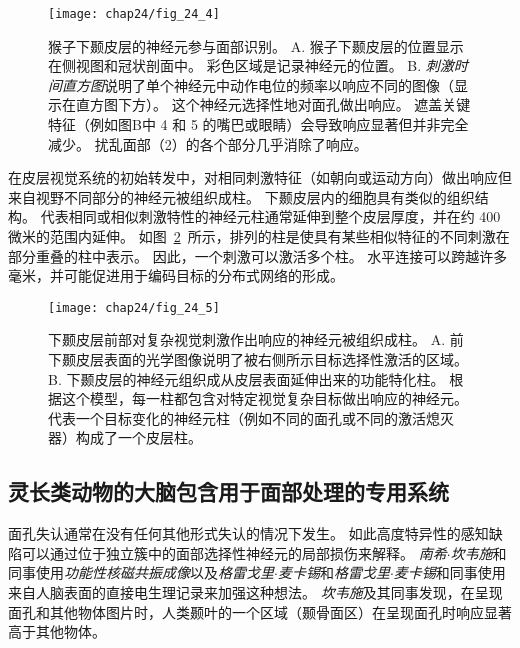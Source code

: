 \begin{figure}[htbp]
	\centering
	\texttt{[image: chap24/fig\_24\_4]}
	\caption{猴子下颞皮层的神经元参与面部识别。
		A. 猴子下颞皮层的位置显示在侧视图和冠状剖面中。
		彩色区域是记录神经元的位置。 
		B. \textit{刺激时间直方图}说明了单个神经元中动作电位的频率以响应不同的图像（显示在直方图下方）。
		这个神经元选择性地对面孔做出响应。
		遮盖关键特征（例如图B中  4 和 5 的嘴巴或眼睛）会导致响应显著但并非完全减少。
		扰乱面部（2）的各个部分几乎消除了响应。}
	\label{fig:24_4}
\end{figure}


在皮层视觉系统的初始转发中，对相同刺激特征（如朝向或运动方向）做出响应但来自视野不同部分的神经元被组织成柱。
下颞皮层内的细胞具有类似的组织结构。
代表相同或相似刺激特性的神经元柱通常延伸到整个皮层厚度，并在约 400 微米的范围内延伸。
如图~\ref{fig:24_5}~所示，排列的柱是使具有某些相似特征的不同刺激在部分重叠的柱中表示。
因此，一个刺激可以激活多个柱。
水平连接可以跨越许多毫米，并可能促进用于编码目标的分布式网络的形成。


\begin{figure}[htbp]
	\centering
	\texttt{[image: chap24/fig\_24\_5]}
	\caption{下颞皮层前部对复杂视觉刺激作出响应的神经元被组织成柱。
		A. 前下颞皮层表面的光学图像说明了被右侧所示目标选择性激活的区域。
		B. 下颞皮层的神经元组织成从皮层表面延伸出来的功能特化柱。
		根据这个模型，每一柱都包含对特定视觉复杂目标做出响应的神经元。
		代表一个目标变化的神经元柱（例如不同的面孔或不同的激活熄灭器）构成了一个皮层柱。}
	\label{fig:24_5}
\end{figure}



\subsection{灵长类动物的大脑包含用于面部处理的专用系统}

面孔失认通常在没有任何其他形式失认的情况下发生。
如此高度特异性的感知缺陷可以通过位于独立簇中的面部选择性神经元的局部损伤来解释。
\textit{南希$\cdot$坎韦施}和同事使用\textit{功能性核磁共振成像}\cite{kanwisher1997fusiform}以及\textit{格雷戈里$\cdot$麦卡锡}和\textit{格雷戈里$\cdot$麦卡锡}和同事使用来自人脑表面的直接电生理记录\cite{mccarthy1997face}来加强这种想法。
\textit{坎韦施}及其同事发现，在呈现面孔和其他物体图片时，人类颞叶的一个区域（颞骨面区）在呈现面孔时响应显著高于其他物体。


